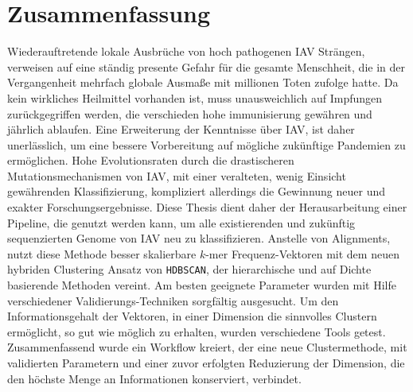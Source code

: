 \chapter*{Zusammenfassung}

Wiederauftretende lokale Ausbrüche von hoch pathogenen \gls{IAV} Strängen, verweisen auf eine ständig presente Gefahr für die gesamte Menschheit, die in der Vergangenheit mehrfach globale Ausmaße mit millionen Toten zufolge hatte. Da kein wirkliches Heilmittel vorhanden ist, muss unausweichlich auf Impfungen zurückgegriffen werden, die verschieden hohe immunisierung gewähren und jährlich ablaufen. Eine Erweiterung der Kenntnisse über \gls{IAV}, ist daher unerlässlich, um eine bessere Vorbereitung auf mögliche zukünftige Pandemien zu ermöglichen. Hohe Evolutionsraten durch die drastischeren Mutationsmechanismen von \gls{IAV}, mit einer veralteten, wenig Einsicht gewährenden Klassifizierung, kompliziert allerdings die Gewinnung neuer und exakter Forschungsergebnisse. Diese Thesis dient daher der Herausarbeitung einer Pipeline, die genutzt werden kann, um alle existierenden und zukünftig sequenzierten Genome von \gls{IAV} neu zu klassifizieren. Anstelle von Alignments, nutzt diese Methode besser skalierbare $k$-mer Frequenz-Vektoren mit dem neuen hybriden Clustering Ansatz von \texttt{HDBSCAN}, der hierarchische und auf Dichte basierende Methoden vereint. Am besten geeignete Parameter wurden mit Hilfe verschiedener Validierungs-Techniken sorgfältig ausgesucht. Um den Informationsgehalt der Vektoren, in einer Dimension die sinnvolles Clustern ermöglicht, so gut wie möglich zu erhalten, wurden verschiedene Tools getest. Zusammenfassend wurde ein Workflow kreiert, der eine neue Clustermethode, mit validierten Parametern und einer zuvor erfolgten Reduzierung der Dimension, die den höchste Menge an Informationen konserviert, verbindet.